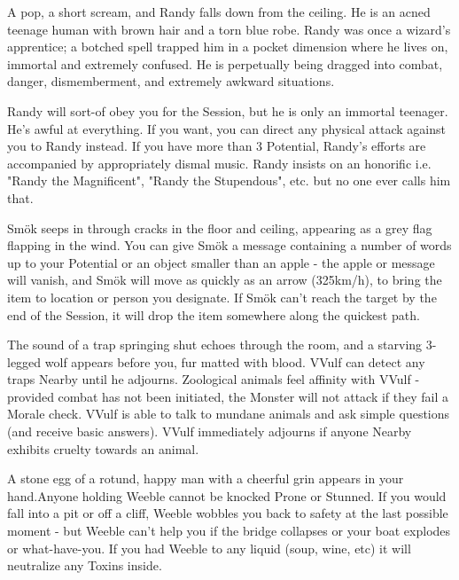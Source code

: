 
A pop, a short scream, and Randy falls down from the ceiling.  He is an acned teenage human with brown hair and a torn blue robe.  Randy was once a wizard's apprentice; a botched spell trapped him in a pocket dimension where he lives on, immortal and extremely confused. He is perpetually being dragged into combat, danger, dismemberment, and extremely awkward situations. 

Randy will sort-of obey you for the Session, but he is only an immortal teenager. He's awful at everything. If you want, you can direct any physical attack against you to Randy instead.  If you have more than 3 Potential, Randy's efforts are accompanied by appropriately dismal music.  Randy insists on an honorific i.e. "Randy the Magnificent", "Randy the Stupendous", etc. but no one ever calls him that.


Smök seeps in through cracks in the floor and ceiling, appearing as a grey flag flapping in the wind.  You can give Smök a message containing a number of words up to your Potential or an object smaller than an apple - the apple or message will vanish, and Smök will move as quickly as an arrow (325km/h), to bring the item to location or person you designate.  If Smök can't reach the target by the end of the Session, it will drop the item somewhere along the quickest path.



The sound of a trap springing shut echoes through the room, and a starving 3-legged wolf appears before you, fur matted with blood.  VVulf can detect any traps Nearby until he adjourns.  Zoological animals feel affinity with VVulf - provided combat has not been initiated, the Monster will not attack if they fail a Morale check.  VVulf is able to talk to mundane animals and ask simple questions (and receive basic answers).  VVulf immediately adjourns if anyone Nearby exhibits cruelty towards an animal.


A stone egg of a rotund, happy man with a cheerful grin appears in your hand.Anyone holding Weeble cannot be knocked Prone or Stunned.  If you would fall into a pit or off a cliff, Weeble wobbles you back to safety at the last possible moment - but Weeble can't help you if the bridge collapses or your boat explodes or what-have-you.  If you had Weeble to any liquid (soup, wine, etc) it will neutralize any Toxins inside.




